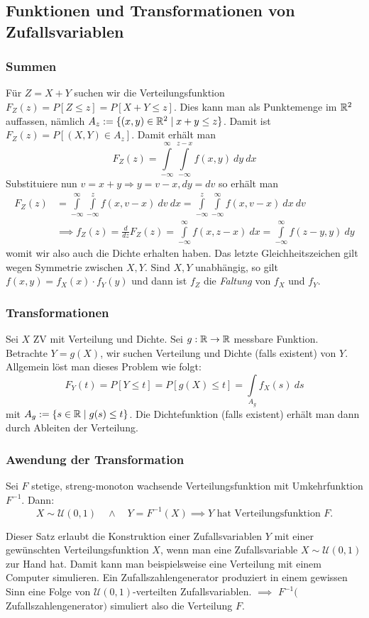 \subsection{Funktionen und Transformationen von Zufallsvariablen}
\subsubsection*{Summen}
Für $Z=X+Y$ suchen wir die Verteilungsfunktion $F_Z(z) = P[Z \leq z] = P[X+Y \leq z]$. Dies kann man als Punktemenge im $\mathbb{R}^2$ auffassen, nämlich $A_z := \{(x,y) \in \mathbb{R}^2 \;|\; x+y \leq z\}$. Damit ist $F_Z(z) = P[(X,Y) \in A_z]$. Damit erhält man 
$$F_Z(z) = \int \limits_{-\infty}^\infty \int \limits_{-\infty}^{z-x} f(x,y) \ dy \ dx $$
Substituiere nun $v=x+y \Rightarrow y = v-x, dy = dv$ so erhält man
\begin{align*}
	F_Z(z) &= \int \limits_{-\infty}^\infty \int \limits_{-\infty}^z f(x,v-x) \ dv \ dx = \int \limits_{-\infty}^z \int \limits_{-\infty}^\infty f(x,v-x) \ dx \ dv \\&\implies f_Z(z) = \frac{d}{dz}F_Z(z) = \int \limits_{-\infty}^\infty f(x,z-x) \ dx = \int \limits_{-\infty}^\infty f(z-y,y) \ dy
\end{align*}
womit wir also auch die Dichte erhalten haben. Das letzte Gleichheitszeichen gilt wegen Symmetrie zwischen $X,Y$. Sind $X,Y$ unabhängig, so gilt $f(x,y) = f_X(x)\cdot f_Y(y)$ und dann ist $f_Z$ die \textit{Faltung} von $f_X$ und $f_Y$.

\subsubsection*{Transformationen}
Sei $X$ ZV mit Verteilung und Dichte. Sei $g:\mathbb{R}\to\mathbb{R}$ messbare Funktion. Betrachte $Y = g(X)$, wir suchen Verteilung und Dichte (falls existent) von $Y$. Allgemein löst man dieses Problem wie folgt:
$$ F_Y(t) = P[Y \leq t] = P [g(X) \leq t] = \int \limits_{A_g} f_X(s) \ ds $$ mit $A_g := \{ s\in \mathbb{R} \;|\; g(s) \leq t\}$. Die Dichtefunktion (falls existent) erhält man dann durch Ableiten der Verteilung.
\subsubsection*{Awendung der Transformation}
\begin{satz}
Sei $F$ stetige, streng-monoton wachsende Verteilungsfunktion mit Umkehrfunktion $F^{-1}$. Dann:
$$ X \sim \mathcal{U}(0,1) \quad \land \quad Y = F^{-1}(X) \implies Y \mbox{ hat Verteilungsfunktion } F.$$
\end{satz}
Dieser Satz erlaubt die Konstruktion einer Zufallsvariablen $Y$ mit einer gewünschten Verteilungsfunktion $X$, wenn man eine Zufallsvariable $X \sim \mathcal{U}(0,1)$ zur Hand hat. Damit kann man beispielsweise eine Verteilung mit einem Computer simulieren. Ein Zufallszahlengenerator produziert in einem gewissen Sinn eine Folge von $\mathcal{U}(0,1)$-verteilten Zufallsvariablen. $\implies$ $F^{-1}($Zufallszahlengenerator$)$ simuliert also die Verteilung $F$.